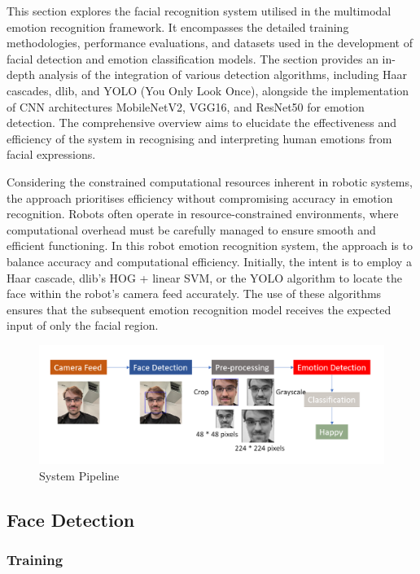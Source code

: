 This section explores the facial recognition system utilised in the multimodal emotion recognition framework. It encompasses the detailed training methodologies, performance evaluations, and datasets used in the development of facial detection and emotion classification models. The section provides an in-depth analysis of the integration of various detection algorithms, including Haar cascades, dlib, and YOLO (You Only Look Once), alongside the implementation of CNN architectures MobileNetV2, VGG16, and ResNet50 for emotion detection. The comprehensive overview aims to elucidate the effectiveness and efficiency of the system in recognising and interpreting human emotions from facial expressions.

Considering the constrained computational resources inherent in robotic systems, the approach prioritises efficiency without compromising accuracy in emotion recognition. Robots often operate in resource-constrained environments, where computational overhead must be carefully managed to ensure smooth and efficient functioning. In this robot emotion recognition system, the approach is to balance accuracy and computational efficiency. Initially, the intent is to employ a Haar cascade, dlib's HOG + linear SVM, or the YOLO algorithm to locate the face within the robot's camera feed accurately. The use of these algorithms ensures that the subsequent emotion recognition model receives the expected input of only the facial region.

\begin{figure}[!htb]
    \centering{}
    \includegraphics[scale=0.85]{fed_images/pipeline.png}
    \caption{System Pipeline}
    \label{figure:pipeline}
\end{figure}

\subsection{Face Detection}

\subsubsection{Training}

